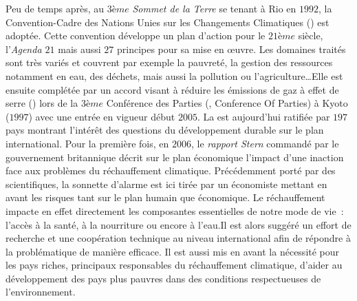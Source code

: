 Peu de temps après, au $3ème$ \textit{Sommet de la Terre} se tenant à Rio en $1992$, la
Convention-Cadre des Nations Unies sur les Changements Climatiques
()
est adoptée. Cette convention développe un plan d’action pour le $21ème$ siècle,
l’\textit{Agenda $21$} mais aussi $27$ principes pour sa mise en œuvre. Les domaines
traités sont très variés et couvrent par exemple la pauvreté, la gestion des ressources
notamment en eau, des déchets, mais aussi la pollution ou l’agriculture\dots Elle est
ensuite complétée par un accord visant à réduire les émissions de gaz à effet de serre
() lors de la $3ème$ Conférence des Parties (, Conference Of Parties) à
Kyoto ($1997$) avec une entrée en vigueur début $2005$. La  est aujourd’hui
ratifiée par $197$ pays montrant l’intérêt des questions du développement durable sur le
plan international. Pour la première fois, en $2006$, le \textit{rapport Stern}
\parencite{Stern2006} commandé par le gouvernement britannique décrit sur le plan
économique l’impact d’une inaction face aux problèmes du réchauffement climatique.
Précédemment porté par des scientifiques, la sonnette d’alarme est ici tirée par un
économiste mettant en avant les risques tant sur le plan humain que économique. Le
réchauffement impacte en effet directement les composantes essentielles de notre mode de
vie~: l’accès à la santé, à la nourriture ou encore à l’eau.Il est alors suggéré un effort
de recherche et une coopération technique au niveau international afin de répondre à la
problématique de manière efficace. Il est aussi mis en avant la nécessité pour les pays
riches, principaux responsables du réchauffement climatique, d’aider au développement des
pays plus pauvres dans des conditions respectueuses de l’environnement.

